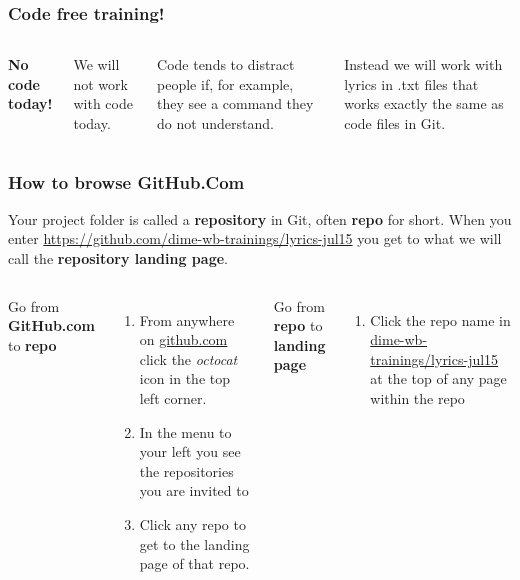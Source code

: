 \documentclass[aspectratio=169]{beamer}
\newcommand{\trainingURL}[1]{{\color{blue}\url{#1}}}
\newcommand{\traininerUsername}{dime-wb-trainings}
\newcommand{\repoName}{\traininerUsername/lyrics-jul15}
\newcommand{\trainingRepoURL}{\href{https://github.com/\repoName}{\trainingURL{https://github.com/\repoName}}}
\begin{document}
\begin{frame}
\frametitle{Code free training!}

	\begin{columns}[c]


		\textbf{No code today!}

		\vspace{.5cm}

		We will not work with code today.

		\vspace{.25cm}

		Code tends to distract people if, for example, they see a command they do not understand.

		\vspace{.25cm}

		Instead we will work with lyrics in .txt files that works exactly the same as code files in Git.


	\end{columns}
\end{frame}

\begin{frame}
\frametitle{How to browse GitHub.Com}

	Your project folder is called a \textbf{repository} in Git, often \textbf{repo} for short.
	When you enter \trainingRepoURL{} you get to what we will call the \textbf{repository landing page}.

	\vspace{.5cm}

	\begin{columns}[T]

		Go from \textbf{GitHub.com} to \textbf{repo}
		\begin{enumerate}
			\item From anywhere on \trainingURL{github.com} click the \textit{octocat} icon in the top left corner.
			\item In the menu to your left you see the repositories you are invited to
			\item Click any repo to get to the landing page of that repo.
		\end{enumerate}

		Go from \textbf{repo} to \textbf{landing page}
		\begin{enumerate}
			\item Click the repo name in {\color{blue}\url{\repoName}} at the top of any page within the repo
		\end{enumerate}

	\end{columns}
\end{frame}
\end{document}
